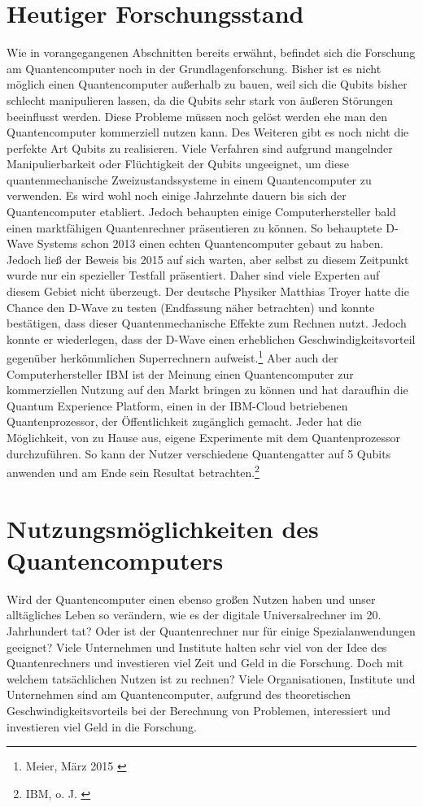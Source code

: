 \documentclass[12pt]{report}
\begin{document}
\section{Heutiger Forschungsstand}
Wie in vorangegangenen Abschnitten bereits erwähnt, befindet sich die Forschung am Quantencomputer noch in der Grundlagenforschung. Bisher ist es nicht möglich einen Quantencomputer außerhalb zu bauen, weil sich die Qubits bisher schlecht manipulieren lassen, da die Qubits sehr stark von äußeren Störungen beeinflusst werden. Diese Probleme müssen noch gelöst werden ehe man den Quantencomputer kommerziell nutzen kann. Des Weiteren gibt es noch nicht die perfekte Art Qubits zu realisieren. Viele Verfahren sind aufgrund mangelnder Manipulierbarkeit oder Flüchtigkeit der Qubits ungeeignet, um diese quantenmechanische Zweizustandssysteme in einem Quantencomputer zu verwenden. Es wird wohl noch einige Jahrzehnte dauern bis sich der Quantencomputer etabliert. \newline
Jedoch behaupten einige Computerhersteller bald einen marktfähigen Quantenrechner präsentieren zu können. So behauptete D-Wave Systems schon 2013 einen echten Quantencomputer gebaut zu haben. Jedoch ließ der Beweis bis 2015 auf sich warten, aber selbst zu diesem Zeitpunkt wurde nur ein spezieller Testfall präsentiert. Daher sind viele Experten auf diesem Gebiet nicht überzeugt. Der deutsche Physiker Matthias Troyer hatte die Chance den D-Wave zu testen (Endfassung näher betrachten) und konnte bestätigen, dass dieser Quantenmechanische Effekte zum Rechnen nutzt. Jedoch konnte er wiederlegen, dass der D-Wave einen erheblichen Geschwindigkeitsvorteil gegenüber herkömmlichen Superrechnern aufweist.\footnote{Meier, März 2015 \cite{j33-1}} Aber auch der Computerhersteller IBM ist der Meinung einen Quantencomputer zur kommerziellen Nutzung auf den Markt bringen zu können und hat daraufhin die \glqq Quantum Experience Platform\grqq , einen in der IBM-Cloud betriebenen Quantenprozessor, der Öffentlichkeit zugänglich gemacht. Jeder hat die Möglichkeit, von zu Hause aus, eigene Experimente mit dem Quantenprozessor durchzuführen. So kann der Nutzer verschiedene Quantengatter auf 5 Qubits anwenden und am Ende sein Resultat betrachten.\footnote{IBM, o. J. \cite{j33-2}} 


\section{Nutzungsmöglichkeiten des Quantencomputers}
Wird der Quantencomputer einen ebenso großen Nutzen haben und unser alltägliches Leben so verändern, wie es der digitale Universalrechner im 20. Jahrhundert tat? Oder ist der Quantenrechner nur für einige Spezialanwendungen geeignet? Viele Unternehmen und Institute halten sehr viel von der Idee des Quantenrechners und investieren viel Zeit und Geld in die Forschung. Doch mit welchem tatsächlichen Nutzen ist zu rechnen?
Viele Organisationen, Institute und Unternehmen sind am Quantencomputer, aufgrund des theoretischen Geschwindigkeitsvorteils bei der Berechnung von Problemen, interessiert und investieren viel Geld in die Forschung. 
\newpage
\end{document}

